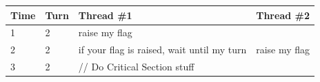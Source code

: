 \begin{longtable}[c]{@{}|l|l|l|l|@{}}
\toprule
\begin{minipage}[b]{0.07\columnwidth}\raggedright\strut
Time
\strut\end{minipage} & \begin{minipage}[b]{0.09\columnwidth}\raggedright\strut
Turn
\strut\end{minipage} & \begin{minipage}[b]{0.15\columnwidth}\raggedright\strut
Thread \#1
\strut\end{minipage} & \begin{minipage}[b]{0.14\columnwidth}\raggedright\strut
Thread \#2
\strut\end{minipage}\tabularnewline
\midrule
\endhead \hline
\begin{minipage}[t]{0.07\columnwidth}\raggedright\strut
1
\strut\end{minipage} & \begin{minipage}[t]{0.09\columnwidth}\raggedright\strut
2
\strut\end{minipage} & \begin{minipage}[t]{0.15\columnwidth}\raggedright\strut
raise my flag
\strut\end{minipage}\hline \tabularnewline
\begin{minipage}[t]{0.07\columnwidth}\raggedright\strut
2
\strut\end{minipage} & \begin{minipage}[t]{0.09\columnwidth}\raggedright\strut
2
\strut\end{minipage} & \begin{minipage}[t]{0.15\columnwidth}\raggedright\strut
if your flag is raised, wait until my turn
\strut\end{minipage} & \begin{minipage}[t]{0.14\columnwidth}\raggedright\strut
raise my flag
\strut\end{minipage} \hline \tabularnewline
\begin{minipage}[t]{0.07\columnwidth}\raggedright\strut
3
\strut\end{minipage} & \begin{minipage}[t]{0.09\columnwidth}\raggedright\strut
2
\strut\end{minipage} & \begin{minipage}[t]{0.15\columnwidth}\raggedright\strut
// Do Critical Section stuff
\strut\end{minipage} & \begin{minipage}[t]{0.14\columnwidth}\raggedright\strut

\end{minipage}
\end{longtable}
